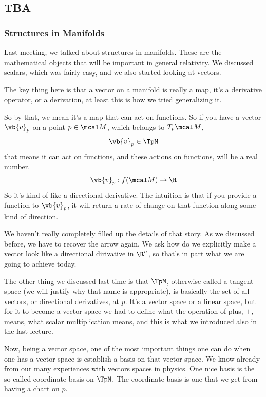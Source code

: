 
\subsection{TBA}
\subsubsection{Structures in Manifolds}

Last meeting, we talked about structures in manifolds.
These are the mathematical objects that will be important
in general relativity. We discussed scalars, which was 
fairly easy, and we also started looking at vectors. 

The key thing here is that a vector on a manifold is really
a map, it's a derivative operator, or a derivation, at least
this is how we tried generalizing it. 

So by that, we mean it's a map that can act on functions. So
if you have a vector $\vb{v}_p$ on a point $p\in\mcal M$, which belongs to $T_p \mcal M$,
\[
	\vb{v}_p \in \TpM 
\]
that means it can act on functions, and these actions on functions, will
be a real number.
\[
	\vb{v}_p: f(\mcal M) \to \R
\]
So it's kind of like a directional derivative. The 
intuition is that if you provide a function to $\vb{v}_p$,
it will return a rate of change on that function along some kind 
of direction. 

We haven't really completely filled up the details of that 
story. As we discussed before, we have to recover the arrow again. We 
ask how do we explicitly make a vector look like a directional 
dirivative in $\R^n$, so that's in part what we are going to
achieve today. 

The other thing we discussed last time is that $\TpM$, otherwise called 
a tangent space (we will justify why that name is appropriate), is basically
the set of all vectors, or directional derivatives, at $p$. It's a vector space or a 
linear space, but for it to become a vector space we had to define what the 
operation of plus, $+$, means, what scalar multiplication means, and this is 
what we introduced also in the last lecture. 

Now, being a vector space, one of the most important things one can do when
one has a vector space is establish a basis on that vector space. We know already
from our many experiences with vectors spaces in physics. One nice basis is the so-called
coordinate basis on $\TpM$. The coordinate basis is one that we get from having a 
chart on $p$.

